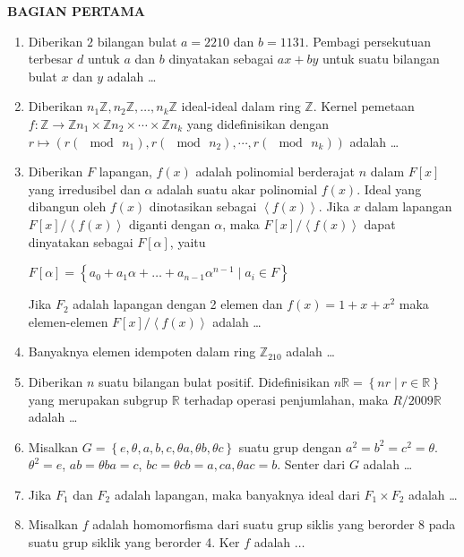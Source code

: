 \documentclass[12pt,twoside]{article}
\begin{document}
\textbf{BAGIAN PERTAMA}
\begin{enumerate}
	\item Diberikan $2$ bilangan bulat $a=2210$ dan $b=1131$. Pembagi persekutuan terbesar $d$ untuk $a$ dan $b$ dinyatakan sebagai $ax+by$ untuk suatu bilangan bulat $x$ dan $y$ adalah \dots

	\item Diberikan $n_1\mathbb{Z}, n_2\mathbb{Z},\dots,n_k\mathbb{Z}$ ideal-ideal dalam ring $\mathbb{Z}$. Kernel pemetaan $f:\mathbb{Z} \to \mathbb{Z}n_1 \times \mathbb{Z}n_2 \times \cdots \times \mathbb{Z}n_k$ yang didefinisikan dengan $r \mapsto (r (\mod\, n_1), r (\mod\, n_2) ,\cdots, r(\mod\,n_k))$ adalah \dots

	\item Diberikan $F$ lapangan, $f(x)$ adalah polinomial berderajat $n$ dalam $F[x]$ yang irredusibel dan $\alpha $ adalah suatu akar polinomial $f(x)$. Ideal yang dibangun oleh $f(x)$ dinotasikan sebagai $\left< f(x) \right>$. Jika $x$ dalam lapangan $F[x]/\left< f(x) \right>$ diganti dengan $\alpha$, maka $F[x]/\left< f(x) \right>$ dapat dinyatakan sebagai $F[\alpha]$, yaitu
	      \begin{center}
		      $F[\alpha] = \left\lbrace a_0+a_1\alpha+\dots+a_{n-1}\alpha^{n-1}\mid a_i \in F\right\rbrace $
	      \end{center}
	      Jika $F_2$ adalah lapangan dengan 2 elemen dan $f(x) = 1 + x + x^2$ maka elemen-elemen $F[x]/\left< f(x) \right>$ adalah \dots

	\item Banyaknya elemen idempoten dalam ring $\mathbb{Z}_{210}$ adalah \dots

	\item Diberikan $n$ suatu bilangan bulat positif. Didefinisikan $n\mathbb{R} {} = \left\lbrace nr \mid r \in \mathbb{R} \right\rbrace$ yang merupakan subgrup $\mathbb{R}$ terhadap operasi penjumlahan, maka $R/2009\mathbb{R}$ adalah \dots

	\item Misalkan $G = \left\lbrace e, \theta,a,b,c,\theta a,\theta b, \theta c \right\rbrace$ suatu grup dengan $a^2 = b^2 = c^2 = \theta$. $\theta ^2 = e$, $ab=\theta ba=c$, $bc = \theta cb = a, ca, \theta ac = b$. Senter dari $G$ adalah \dots

	\item Jika $F_1$ dan $F_2$ adalah lapangan, maka banyaknya ideal dari $F_1 \times F_2$ adalah \dots

	\item Misalkan $f$ adalah homomorfisma dari suatu grup siklis yang berorder 8 pada suatu grup siklik yang berorder 4. Ker $f$ adalah $\dots$
\end{enumerate}
\end{document}
